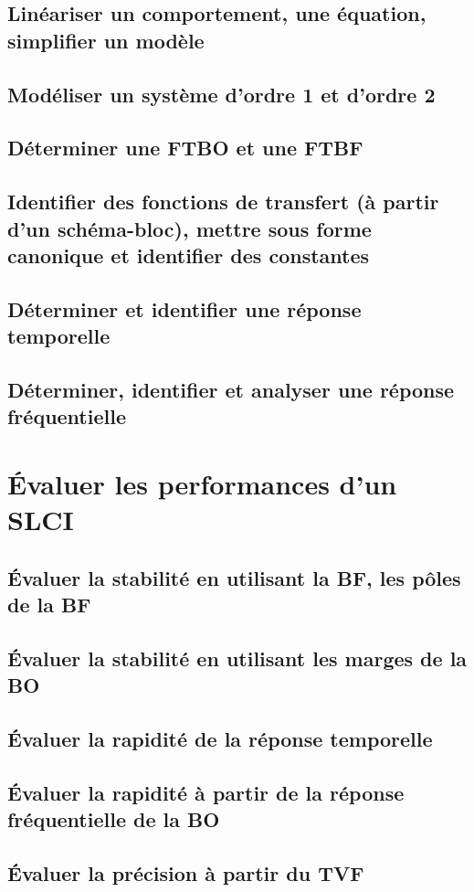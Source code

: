 \section{Linéariser un comportement, une équation, simplifier un modèle} 
\section{Modéliser un système d'ordre 1 et d'ordre 2} 
\section{Déterminer une FTBO et une FTBF} 
\section{Identifier des fonctions de transfert (à partir d'un schéma-bloc), mettre sous forme canonique et identifier des constantes} 
\section{Déterminer et identifier une réponse temporelle} 
\section{Déterminer, identifier et analyser une réponse fréquentielle} 
\setchapterpreamble[u]{\margintoc} 
\chapter{Évaluer les performances d'un SLCI} 
\section{Évaluer la stabilité en utilisant la BF, les pôles de la BF} 
\section{Évaluer la stabilité en utilisant les marges de la BO} 
\section{Évaluer la rapidité de la réponse temporelle} 
\section{Évaluer la rapidité à partir de la réponse fréquentielle de la BO} 
\section{Évaluer la précision à partir du TVF} 
